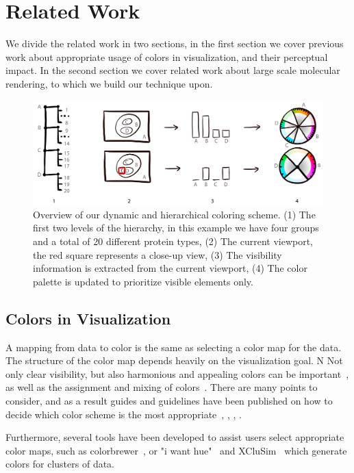 \documentclass[review,journal]{vgtc}         %
\begin{document}
\section{Related Work}

We divide the related work in two sections, in the first section we cover previous work about appropriate usage of colors in visualization, and their perceptual impact. 
In the second section we cover related work about large scale molecular rendering, to which we build our technique upon.

\begin{figure}[t]
	\centering
	\includegraphics[width=0.85\linewidth]{Figures/coloroverview}
	\caption{Overview of our dynamic and hierarchical coloring scheme. (1) The first two levels of the hierarchy, in this example we have four groups and a total of 20 different protein types, (2) The current viewport, the red square represents a close-up view, (3) The visibility information is extracted from the current viewport, (4) The color palette is updated to prioritize visible elements only.}
	\label{fig:coloroverview}
\end{figure}



\subsection{Colors in Visualization}

A mapping from data to color is the same as selecting a color map for the data. 
The structure of the color map depends heavily on the visualization goal. 
N
Not only clear visibility, but also harmonious and appealing colors can be important~\cite{ihaka2003colour}, as well as the assignment and mixing of colors~\cite{wang2008color}. 
There are many points to consider, and as a result guides and guidelines have been published on how to decide which color scheme is the most appropriate~\cite{bergman1995rule}, \cite{healey1996choosing}, \cite{bernard2015survey}, \cite{steiger2015explorative}.

Furthermore, several tools have been developed to assist users select appropriate color maps, such as colorbrewer~\cite{harrower2003colorbrewer}, or "i want hue"~\cite{iwanthue} and XCluSim~\cite{l2015xclusim} which generate colors for clusters of data. 
\end{document}
